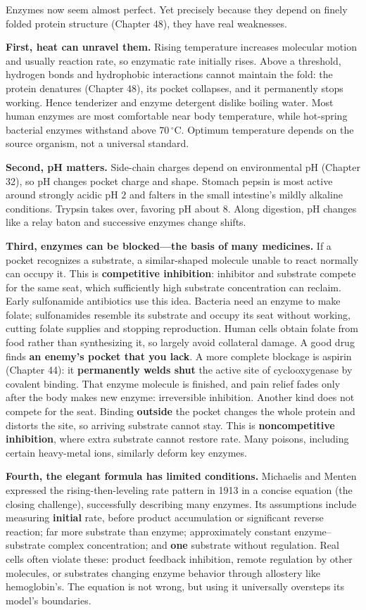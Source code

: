 Enzymes now seem almost perfect. Yet precisely because they depend on finely folded protein structure (Chapter 48), they have real weaknesses.

\textbf{First, heat can unravel them.} Rising temperature increases molecular motion and usually reaction rate, so enzymatic rate initially rises. Above a threshold, hydrogen bonds and hydrophobic interactions cannot maintain the fold: the protein denatures (Chapter 48), its pocket collapses, and it permanently stops working. Hence tenderizer and enzyme detergent dislike boiling water. Most human enzymes are most comfortable near body temperature, while hot-spring bacterial enzymes withstand above $70\,^{\circ}\mathrm{C}$. Optimum temperature depends on the source organism, not a universal standard.

\textbf{Second, pH matters.} Side-chain charges depend on environmental pH (Chapter 32), so pH changes pocket charge and shape. Stomach pepsin is most active around strongly acidic pH $2$ and falters in the small intestine's mildly alkaline conditions. Trypsin takes over, favoring pH about $8$. Along digestion, pH changes like a relay baton and successive enzymes change shifts.

\textbf{Third, enzymes can be blocked---the basis of many medicines.} If a pocket recognizes a substrate, a similar-shaped molecule unable to react normally can occupy it. This is \textbf{competitive inhibition}: inhibitor and substrate compete for the same seat, which sufficiently high substrate concentration can reclaim. Early sulfonamide antibiotics use this idea. Bacteria need an enzyme to make folate; sulfonamides resemble its substrate and occupy its seat without working, cutting folate supplies and stopping reproduction. Human cells obtain folate from food rather than synthesizing it, so largely avoid collateral damage. A good drug finds \textbf{an enemy's pocket that you lack}. A more complete blockage is aspirin (Chapter 44): it \textbf{permanently welds shut} the active site of cyclooxygenase by covalent binding. That enzyme molecule is finished, and pain relief fades only after the body makes new enzyme: irreversible inhibition. Another kind does not compete for the seat. Binding \textbf{outside} the pocket changes the whole protein and distorts the site, so arriving substrate cannot stay. This is \textbf{noncompetitive inhibition}, where extra substrate cannot restore rate. Many poisons, including certain heavy-metal ions, similarly deform key enzymes.

\textbf{Fourth, the elegant formula has limited conditions.} Michaelis and Menten expressed the rising-then-leveling rate pattern in 1913 in a concise equation (the closing challenge), successfully describing many enzymes. Its assumptions include measuring \textbf{initial} rate, before product accumulation or significant reverse reaction; far more substrate than enzyme; approximately constant enzyme--substrate complex concentration; and \textbf{one} substrate without regulation. Real cells often violate these: product feedback inhibition, remote regulation by other molecules, or substrates changing enzyme behavior through allostery like hemoglobin's. The equation is not wrong, but using it universally oversteps its model's boundaries.


